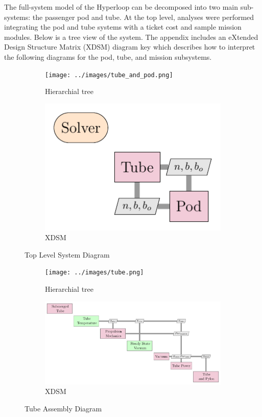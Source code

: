 The full-system model of the Hyperloop can be decomposed into two main
sub-systems: the passenger pod and tube. At the top level, analyses were
performed integrating the pod and tube systems with a ticket cost  and sample
mission modules. Below is a tree view of the system.
The appendix includes an eXtended Design Structure Matrix (XDSM) diagram key
which describes how to interpret the following diagrams for the pod, tube, and mission subsystems.

\begin{figure}
\centering
\begin{subfigure}{.5\textwidth}
  \centering
  \texttt{[image: ../images/tube\_and\_pod.png]}
  \caption{Hierarchial tree}
  \label{fig:tree:tube_and_pod}
\end{subfigure}%
\begin{subfigure}{.5\textwidth}
  \centering
  \includegraphics{../images/xdsm/tube_and_pod.pdf}
  \caption{XDSM}
  \label{fig:xdsm:toplevel}
\end{subfigure}
\caption{Top Level System Diagram}
\label{fig:top}
\end{figure}

\begin{figure}
\centering
\begin{subfigure}{.5\textwidth}
  \centering
  \texttt{[image: ../images/tube.png]}
  \caption{Hierarchial tree}
  \label{fig:tree:tube}
\end{subfigure}%
\begin{subfigure}{.5\textwidth}
  \centering
  \includegraphics{../images/xdsm/tube.pdf}
  \caption{XDSM}
  \label{fig:xdsm:tube}
\end{subfigure}
\caption{Tube Assembly Diagram}
\label{fig:tube}
\end{figure}

